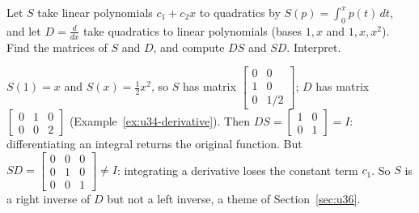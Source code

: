 \begin{exercise}\label{exr:u34-integral}
Let $S$ take linear polynomials $c_1+c_2x$ to quadratics by $S(p)=\int_0^xp(t)\,dt$, and let $D=\frac{d}{dx}$
take quadratics to linear polynomials (bases $1,x$ and $1,x,x^2$). Find the matrices of $S$ and $D$, and
compute $DS$ and $SD$. Interpret.
\end{exercise}
\begin{solution}
$S(1)=x$ and $S(x)=\tfrac12x^2$, so $S$ has matrix $\left[\begin{smallmatrix}0&0\\1&0\\0&1/2\end{smallmatrix}\right]$; $D$
has matrix $\left[\begin{smallmatrix}0&1&0\\0&0&2\end{smallmatrix}\right]$ (Example~\ref{ex:u34-derivative}).
Then $DS=\left[\begin{smallmatrix}1&0\\0&1\end{smallmatrix}\right]=I$: differentiating an integral returns the
original function. But $SD=\left[\begin{smallmatrix}0&0&0\\0&1&0\\0&0&1\end{smallmatrix}\right]\ne I$: integrating a
derivative loses the constant term $c_1$. So $S$ is a right inverse of $D$ but not a left inverse,
a theme of Section~\ref{sec:u36}.
\end{solution}
